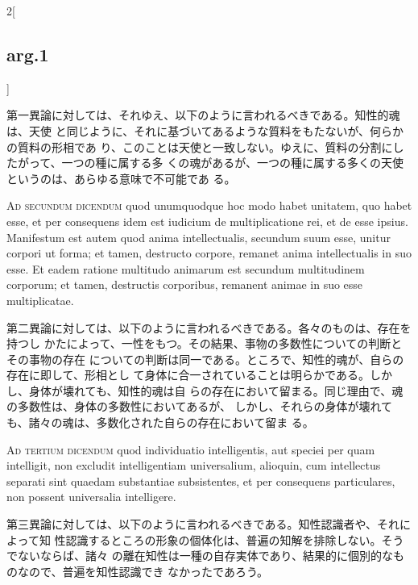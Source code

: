 \documentclass[paper=a4paper,fontsize=10pt,jafontsize=9pt,titlepage]{jlreq}
\begin{document}
\begin{paracol}{2}[\subsection{arg.1}]
\switchcolumn

 第一異論に対しては、それゆえ、以下のように言われるべきである。知性的魂は、天使
 と同じように、それに基づいてあるような質料をもたないが、何らかの質料の形相であ
 り、このことは天使と一致しない。ゆえに、質料の分割にしたがって、一つの種に属する多
 くの魂があるが、一つの種に属する多くの天使というのは、あらゆる意味で不可能であ
 る。
 
\switchcolumn*[\subsection{ad 2}]

{\scshape Ad secundum dicendum} quod unumquodque hoc modo habet unitatem, quo
habet esse, et per consequens idem est iudicium de multiplicatione rei, et de
esse ipsius. Manifestum est autem quod anima intellectualis, secundum suum esse,
unitur corpori ut forma; et tamen, destructo corpore, remanet anima
intellectualis in suo esse. Et eadem ratione multitudo animarum est secundum
multitudinem corporum; et tamen, destructis corporibus, remanent animae in suo
esse multiplicatae.

\switchcolumn

 第二異論に対しては、以下のように言われるべきである。各々のものは、存在を持つし
 かたによって、一性をもつ。その結果、事物の多数性についての判断とその事物の存在
 についての判断は同一である。ところで、知性的魂が、自らの存在に即して、形相とし
 て身体に合一されていることは明らかである。しかし、身体が壊れても、知性的魂は自
 らの存在において留まる。同じ理由で、魂の多数性は、身体の多数性においてあるが、
 しかし、それらの身体が壊れても、諸々の魂は、多数化された自らの存在において留ま
 る。

 
\switchcolumn*[\subsection{ad 3}]

 {\scshape Ad tertium dicendum} quod individuatio intelligentis, aut speciei per
 quam intelligit, non excludit intelligentiam universalium, alioquin, cum
 intellectus separati sint quaedam substantiae subsistentes, et per consequens
 particulares, non possent universalia intelligere.

\switchcolumn

第三異論に対しては、以下のように言われるべきである。知性認識者や、それによって知
性認識するところの形象の個体化は、普遍の知解を排除しない。そうでないならば、諸々
の離在知性は一種の自存実体であり、結果的に個別的なものなので、普遍を知性認識でき
なかったであろう。
 

\end{paracol}
\end{document}
